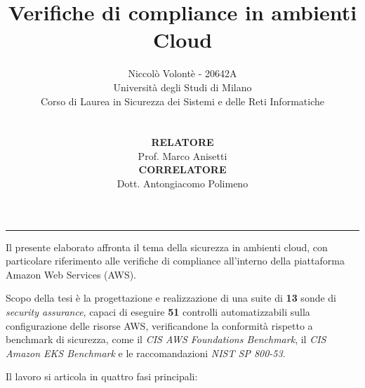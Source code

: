 \documentclass[11pt,a4paper]{article}
\title{\bfseries Verifiche di compliance in ambienti Cloud}
\author{Niccolò Volontè - 20642A\\[0.5em]
\normalsize Università degli Studi di Milano\\
\normalsize Corso di Laurea in Sicurezza dei Sistemi e delle Reti Informatiche\\
%
\\
\begin{minipage}[t]{0.45\textwidth}
\raggedright
\textbf{RELATORE}\\
Prof. Marco Anisetti
\end{minipage}
\hfill
\begin{minipage}[t]{0.45\textwidth}
\raggedleft
\textbf{CORRELATORE}\\
Dott. Antongiacomo Polimeno
\end{minipage}
}
\begin{document}
\maketitle
\vspace{1em}
\hrule
\vspace{1em}
Il presente elaborato affronta il tema della sicurezza in ambienti cloud, con particolare riferimento alle verifiche di compliance all'interno della piattaforma Amazon Web Services (AWS). 

Scopo della tesi è la progettazione e realizzazione di una suite di \textbf{13} sonde di \emph{security assurance}, capaci di eseguire \textbf{51} controlli automatizzabili sulla configurazione delle risorse AWS, verificandone la conformità rispetto a benchmark di sicurezza, come il \emph{CIS AWS Foundations Benchmark}, il \emph{CIS Amazon EKS Benchmark} e le raccomandazioni \emph{NIST SP 800-53}.

Il lavoro si articola in quattro fasi principali:
\end{document}
